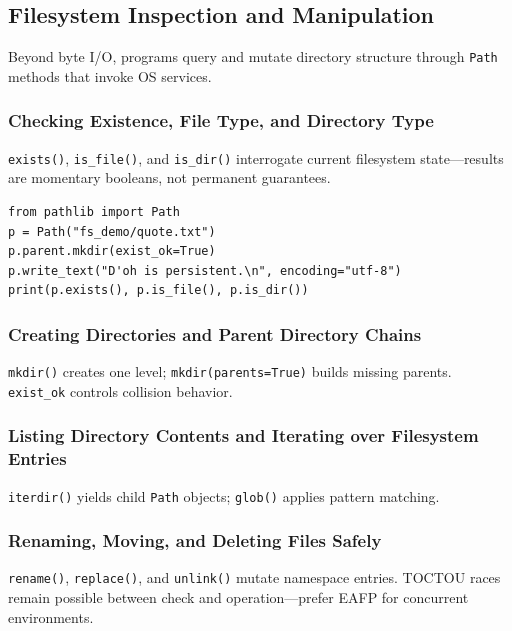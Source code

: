 \subsection{Filesystem Inspection and Manipulation}

Beyond byte I/O, programs query and mutate directory structure through \texttt{Path} methods that invoke OS services.

\subsubsection{Checking Existence, File Type, and Directory Type}

\texttt{exists()}, \texttt{is\_file()}, and \texttt{is\_dir()} interrogate current filesystem state---results are momentary booleans, not permanent guarantees.

\begin{verbatim}
from pathlib import Path
p = Path("fs_demo/quote.txt")
p.parent.mkdir(exist_ok=True)
p.write_text("D'oh is persistent.\n", encoding="utf-8")
print(p.exists(), p.is_file(), p.is_dir())
\end{verbatim}

\subsubsection{Creating Directories and Parent Directory Chains}

\texttt{mkdir()} creates one level; \texttt{mkdir(parents=True)} builds missing parents. \texttt{exist\_ok} controls collision behavior.

\subsubsection{Listing Directory Contents and Iterating over Filesystem Entries}

\texttt{iterdir()} yields child \texttt{Path} objects; \texttt{glob()} applies pattern matching.

\subsubsection{Renaming, Moving, and Deleting Files Safely}

\texttt{rename()}, \texttt{replace()}, and \texttt{unlink()} mutate namespace entries. TOCTOU races remain possible between check and operation---prefer EAFP for concurrent environments.
